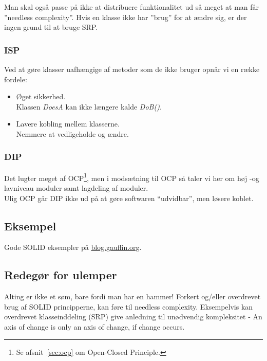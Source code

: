 Man skal også passe på ikke at distribuere funktionalitet ud så meget at man får ”needless complexity”. Hvis en klasse ikke har ”brug” for at ændre sig, er der ingen grund til at bruge SRP.\\


\subsubsection{ISP}
Ved at gøre klasser uafhængige af metoder som de ikke bruger opnår vi en række fordele:

\begin{itemize}
	\item Øget sikkerhed.\\
	Klassen \textit{DoesA} kan ikke længere kalde \textit{DoB()}.
	\item Lavere kobling mellem klasserne.\\
	Nemmere at vedligeholde og ændre.
\end{itemize}

\subsubsection{DIP}
Det lugter meget af OCP\footnote{Se afsnit~\ref{sec:ocp} om Open-Closed Principle.}, men i modsætning til OCP så taler vi her om høj -og lavniveau moduler samt lagdeling af moduler.\\

Ulig OCP går DIP ikke ud på at gøre softwaren “udvidbar”, men løsere koblet.

\subsection{Eksempel}
Gode SOLID eksempler på \href{http://blog.gauffin.org/2012/05/11/solid-principles-with-real-world-examples/}{blog.gauffin.org}.

\subsection{Redegør for ulemper}
Alting er ikke et søm, bare fordi man har en hammer! Forkert og/eller overdrevet brug af SOLID principperne, kan føre til needless complexity. Eksempelvis kan overdrevet klasseinddeling (SRP) give anledning til unødvendig kompleksitet - An axis of change is only an axis of change, if change occurs.